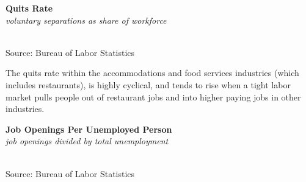 \documentclass{report}
\makeatletter
\newcommand{\tbllink}[1]{\href{https://raw.githubusercontent.com/bdecon/US-chartbook/master/chartbook/data/#1}{\faTable}}
\newcommand*\short[1]{\expandafter\@gobbletwo\number\numexpr#1\relax}
\newcommand{\stdnode}[3]{\node[below, align=left, shift=({#1,#2})]{#3};}
\newcommand{\dateaxisticks}{
		date coordinates in=x, axis line style={draw=none},
		xmax={2021-05-15},
		max space between ticks=40,	    
		xtick={{1990-01-01}, {1992-01-01}, {1994-01-01}, 
			{1996-01-01}, {1998-01-01}, {2000-01-01}, 
			{2002-01-01}, {2004-01-01}, {2006-01-01},
			{2008-01-01}, {2010-01-01}, {2012-01-01}, {2014-01-01},
		    {2016-01-01}, {2018-01-01}, {2020-01-01}},
		minor xtick={{1989-01-01}, {1991-01-01}, {1993-01-01},
			{1995-01-01}, {1997-01-01}, {1999-01-01}, 
			{2001-01-01}, {2003-01-01}, {2005-01-01}, {2007-01-01},
		    {2009-01-01}, {2011-01-01}, {2013-01-01}, {2015-01-01},
		    {2017-01-01}, {2019-01-01}, {2021-01-01}},
		enlarge y limits={0.06}, enlarge x limits={0.01},
		}
\newcommand{\shdateaxisticks}{
		date coordinates in=x, axis line style={draw=none},
		xmax={2021-05-15},
		max space between ticks=40,	    
		xtick={{1990-01-01}, {1995-01-01}, {2000-01-01}, 
			{2005-01-01}, {2010-01-01}, {2015-01-01}, {2020-01-01}},
		minor xtick={},
		enlarge y limits={0.06}, enlarge x limits={0.01},
		}
\newcommand{\bbar}[2]{extra #1 ticks = {{#2}}, extra #1 tick labels = ,
		extra #1 tick style = {grid=major, grid style={thick, black!25}},}
\newcommand{\stdline}[4]{\addplot[very thick, no markers, color=#1] 
		table [x=#2, y=#3, col sep=comma] {#4};	}
\newcommand{\thinline}[4]{\addplot[no markers, color=#1] 
		table [x=#2, y=#3, col sep=comma] {#4};	}
\newcommand{\rebars}{
		\fill[color=black!10] (axis cs:{2007-12-01},\pgfkeysvalueof{/pgfplots/ymin}) rectangle 
			(axis cs:{2009-07-01}, \pgfkeysvalueof{/pgfplots/ymax});
		\fill[color=black!10] (axis cs:{2001-03-01},\pgfkeysvalueof{/pgfplots/ymin}) rectangle 
			(axis cs:{2001-11-01}, \pgfkeysvalueof{/pgfplots/ymax});
		\fill[color=black!10] (axis cs:{2020-02-01},\pgfkeysvalueof{/pgfplots/ymin}) rectangle 
			(axis cs:{2021-05-15}, \pgfkeysvalueof{/pgfplots/ymax});}
\makeatother
\begin{document}
{{\begin{minipage}{0.38\textwidth}
\normalsize \textbf{Quits Rate}\\
\footnotesize{\textit{voluntary separations as share of workforce}}\\
\hspace*{-2mm} \\
\footnotesize{Source: Bureau of Labor Statistics} \hfill \tbllink{quits.csv}
\end{minipage}
\hspace{9mm}
\begin{minipage}{0.31\textwidth}
\small The quits rate within the accommodations and food services industries (which includes restaurants), is highly cyclical, and tends to rise when a tight labor market pulls people out of restaurant jobs and into higher paying jobs in other industries. 
\end{minipage}
\newpage
\begin{minipage}{0.76\textwidth}
\small 
\vspace{1mm}

\normalsize \textbf{Job Openings Per Unemployed Person}\\
\footnotesize{\textit{job openings divided by total unemployment}}\\
\hspace*{-2mm} \\
\footnotesize{Source: Bureau of Labor Statistics} \hfill \tbllink{unjo.csv}
\end{minipage}
\vspace{7mm}

}}
\end{document}
